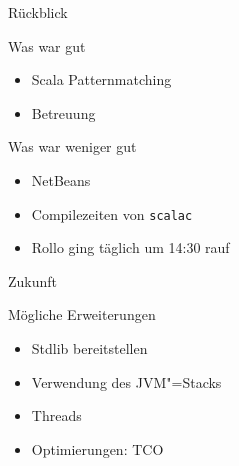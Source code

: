 \documentclass[hyperref={pdfpagelabels=false}]{beamer}
\begin{document}
\begin{frame}{Rückblick}
  \begin{exampleblock}{Was war gut}
    \begin{itemize}
      \item Scala Patternmatching
      \item Betreuung \smiley
    \end{itemize}
  \end{exampleblock}
  \begin{alertblock}{Was war weniger gut}
    \begin{itemize}
      \item NetBeans
      \item Compilezeiten von \texttt{scalac}
      \item Rollo ging täglich um 14:30 rauf \frowny
    \end{itemize}
  \end{alertblock}
\end{frame}

\begin{frame}{Zukunft}
  \begin{block}{Mögliche Erweiterungen}
    \begin{itemize}
      \item Stdlib bereitstellen
      \item Verwendung des JVM"=Stacks
      \item Threads
      \item Optimierungen: TCO
    \end{itemize}
  \end{block}
\end{frame}
\end{document}
